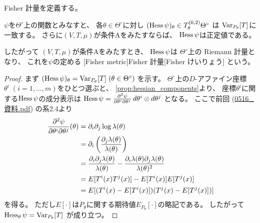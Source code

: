 \documentclass[report]{jlreq}
\begin{document}
Fisher 計量を定義する。

\begin{propdef}[Fisher 計量]
    $\psi$を$\Theta^\circ$上の\smooth 関数とみなすと、
    各$\theta \in \Theta^\circ$に対し
    $(\operatorname{Hess} \psi)_\theta
        \in T^{(0, 2)}_\theta \Theta^\circ$
    は
    $\operatorname{Var}_{P_\theta}[T]$に一致する。
    さらに$(V, T, \mu)$が条件Aをみたすならば、
    $\operatorname{Hess} \psi$は正定値である。

    したがって
    $(V, T, \mu)$が条件Aをみたすとき、
    $\operatorname{Hess}\psi$は
    $\Theta^\circ$上の Riemann 計量となり、
    これを$\psi$の定める
    [Fisher metric]{Fisher 計量}[Fisher けいりょう]
    という。
\end{propdef}

\begin{proof}
    まず
    $(\operatorname{Hess} \psi)_\theta = \operatorname{Var}_{P_\theta}[T] \;
        (\theta \in \Theta^\circ)$
    を示す。
    $\Theta^\circ$上の$D$-アファイン座標
    $\theta^i \; (i = 1, \dots, m)$をひとつ選ぶと、
    \cref{prop:hessian_components}より、
    座標$\theta^i$に関する$\operatorname{Hess} \psi$の成分表示は
    $\operatorname{Hess}\psi
        = \frac{\partial^2 \psi}{\partial \theta^i \partial \theta^j}
        \, d\theta^i \otimes d\theta^j$
    となる。
    ここで前回 (\url{0516_資料.pdf}) の系2.4より
    \begin{alignat}{1}
        \frac{\partial^2 \psi}{\partial \theta^i \partial \theta^j}(\theta)
            &=
                \partial_i \partial_j \log \lambda(\theta)
                \\
            &=
                \partial_i \left({
                    \frac{\partial_j \lambda(\theta)}{\lambda(\theta)}
                }\right)
                \\
            &=
                \frac{
                    \partial_i \partial_j \lambda(\theta)
                }{
                    \lambda(\theta)
                }
                -
                \frac{
                    \partial_i \lambda(\theta)
                    \partial_j \lambda(\theta)
                }{
                    \lambda(\theta)^2
                }
                \\
            &=
                E[T^i(x) T^j(x)]
                -
                E[T^i(x)]
                E[T^j(x)]
                \\
            &=
                E[
                    (T^i(x) - E[T^i(x)])
                    (T^j(x) - E[T^j(x)])
                ]
    \end{alignat}
    を得る。
    ただし$E[\cdot]$は$P_\theta$に関する期待値$E_{P_\theta}[\cdot]$の略記である。
    したがって
    $\operatorname{Hess}_\theta \psi = \operatorname{Var}_{P_\theta}[T]$
    が成り立つ。


\end{proof}
\end{document}
